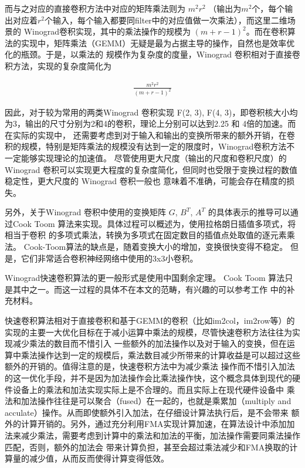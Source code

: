 而与之对应的直接卷积方法中对应的矩阵乘法则为 $m^2r^2$ （输出为$m^2$个，每个输出对应着$r^2$个输入，每个输入都要同filter中的对应值做一次乘法），而这里二维场景的
Winograd卷积实现，其中的乘法操作的规模为 $( m + r - 1)^2$。而在卷积算法的实现中，矩阵乘法（GEMM）无疑是最为占据主导的操作，自然也是效率优化的瓶颈。于是，以乘法的
规模作为复杂度的度量，Winograd 卷积相对于直接卷积方法，实现的复杂度简化为

\begin{align}
  \label{eq:winograd_reduction}
  \frac{m^2r^2}{(m+r-1)^2}
\end{align}

因此，对于较为常用的两类Winograd 卷积实现 F(2, 3), F(4, 3)，即卷积核大小均为3，输出的尺寸分别为2和4的卷积，理论上分别可以达到2.25 和 4倍的加速。而在实际的实现中，
还需要考虑到对于输入和输出的变换所带来的额外开销，在卷积的规模，特别是矩阵乘法的规模没有达到一定的限度时，Winograd卷积方法不一定能够实现理论的加速值。
尽管使用更大尺度（输出的尺度和卷积尺度）的Winograd 卷积可以实现更大程度的复杂度简化，但同时也受限于变换过程的数值稳定性，更大尺度的 Winograd 卷积一般也
意味着不准确，可能会存在精度的损失。

另外，关于Winograd 卷积中使用的变换矩阵 $G$, $B^T$, $A^T$ 的具体表示的推导可以通过Cook Toom 算法来实现。具体过程可以概述为，使用拉格朗日插值多项式，将相当于卷积
的多项式乘法，转换为多项式在固定数目的插值点处取值的逐元素乘法。 Cook-Toom算法的缺点是，随着变换大小的增加，变换很快变得不稳定。 但是，它们非常适合卷积神经网络中使用的3x3小卷积。

Winograd快速卷积算法的更一般形式是使用中国剩余定理。 Cook Toom 算法只是其中之一。而这一过程的具体不在本文的范畴，有兴趣的可以参考工作\cite{Lavin2015FastAF} 中的补充材料。


快速卷积算法相对于直接卷积和基于GEMM的卷积（比如im2col，im2row等）的实现的主要一大优化目标在于减小运算中乘法的规模，尽管快速卷积方法往往为实现减少乘法的数目而不惜引入
一些额外的加法操作以及对于输入的变换，但在运算中乘法操作达到一定的规模后，乘法数目减少所带来的计算收益是可以超过这些额外的开销的。值得注意的是，快速卷积方法中为减少乘法
操作而不惜引入加法的这一优化手段，并不是因为加法操作会比乘法操作快，这个概念具体到现代的硬件设备上的乘法和加法实现实际上是不合理的。而且实际上在现代硬件设备中
乘法和加法操作往往是可以聚合（fused）在一起的，也就是乘累加（multiply and acculate）操作。从而即使额外引入加法，在仔细设计算法执行后，是不会带来 额外的计算开销的。另外，通过充分利用FMA实现计算加速，在算法设计中添加加法来减少乘法，需要考虑到计算中的乘法和加法的平衡，加法操作需要同乘法操作匹配，否则，额外的加法会
带来计算负担，甚至会超过乘法减少和FMA换取的计算量的减少值，从而反而使得计算变得低效。

